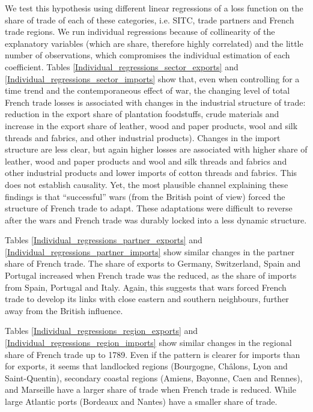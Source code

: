\documentclass[12pt,a4paper,notitlepage,english]{article}
\begin{document}
We test this hypothesis using different linear regressions of a loss function on the share of trade of each of these categories, i.e. SITC, trade partners and French trade regions.
We run individual regressions because of collinearity of the explanatory variables (which are share, therefore highly correlated) and the little number of observations, which compromises the individual estimation of each coefficient.
Tables \ref{Individual_regressions_sector_exports} and \ref{Individual_regressions_sector_imports} show that, even when controlling for a time trend and the contemporaneous effect of war, the changing level of total French trade losses is associated with changes in the industrial structure of trade: reduction in the export share of plantation foodstuffs, crude materials and increase in the export share of leather, wood and paper products, wool and silk threads and fabrics, and other industrial products).
Changes in the import structure are less clear, but again higher losses are associated with higher share of leather, wood and paper products and wool and silk threads and fabrics and other industrial products and lower imports of cotton threads and fabrics.
This does not establish causality. Yet, the most plausible channel explaining these findings is that ``successful'' wars (from the British point of view) forced the structure of French trade to adapt.
These adaptations were difficult to reverse after the wars and French trade was durably locked into a less dynamic structure.

Tables \ref{Individual_regressions_partner_exports} and \ref{Individual_regressions_partner_imports} show similar changes in the partner share of French trade.
The share of exports to Germany, Switzerland, Spain and Portugal increased when French trade was the reduced, as the share of imports from Spain, Portugal and Italy. 
Again, this suggests that wars forced French trade to develop its links with close eastern and southern neighbours, further away from the British influence.

Tables \ref{Individual_regressions_region_exports} and \ref{Individual_regressions_region_imports} show similar changes in the regional share of French trade up to 1789.
Even if the pattern is clearer for imports than for exports, it seems that landlocked regions (Bourgogne, Châlons, Lyon and Saint-Quentin), secondary coastal regions (Amiens, Bayonne, Caen and Rennes), and Marseille have a larger share of trade when French trade is reduced.
While large Atlantic ports (Bordeaux and Nantes) have a smaller share of trade.
\end{document}
